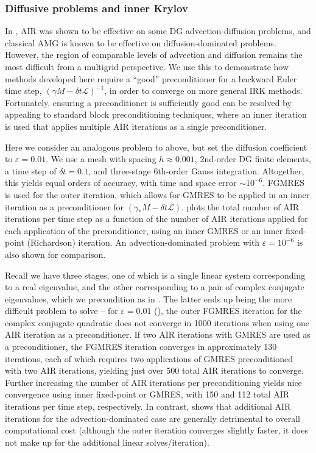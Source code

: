 \documentclass[a4paper,10pt]{article}
\begin{document}
\subsubsection{Diffusive problems and inner Krylov}\label{sec:numerics:dg:diff}

In \cite{Manteuffel:2019}, AIR was shown to be effective on some DG advection-diffusion
problems, and classical AMG is known to be effective on diffusion-dominated
problems. However, the region of comparable levels of advection and diffusion
remains the most difficult from a multigrid perspective. We use this to
demonstrate how methods developed here require a ``good'' preconditioner
for a backward Euler time step, $(\gamma M - \delta t \mathcal{L})^{-1}$,
in order to converge on more general IRK
methods. Fortunately, ensuring a preconditioner is sufficiently good can be
resolved by appealing to standard block preconditioning techniques, where an inner
iteration is used that applies multiple AIR iterations as a single preconditioner.

Here we consider an analogous problem to above, but set the diffusion coefficient
to $\varepsilon = 0.01$. We use a mesh with spacing $h \approx 0.001$, 2nd-order
DG finite elements, a time step of $\delta t = 0.1$, and three-stage 6th-order
Gauss integration. Altogether, this yields equal orders of accuracy, with time and
space error $\sim10^{-6}$. FGMRES \cite{saad1993flexible} is used for the
outer iteration, which allows for GMRES to be applied in an inner iteration
as a preconditioner for $(\gamma_* M - \delta t \mathcal{L})$.  plots the
total number of AIR iterations per time step as a function of the number of
AIR iterations applied for each application of the preconditioner, using an
inner GMRES or an inner fixed-point (Richardson) iteration. An advection-dominated
problem with $\varepsilon = 10^{-6}$ is also shown for comparison.

Recall we have three stages, one of which is a single linear system corresponding
to a real eigenvalue, and the other corresponding to a pair of complex conjugate
eigenvalues, which we precondition as in . The latter ends up being
the more difficult problem to solve -- for $\varepsilon =0.01$ (),
the outer FGMRES iteration for the complex conjugate quadratic does not converge in
1000 iterations when using one AIR iteration as a preconditioner.
If two AIR iterations with GMRES are used as a preconditioner,
the FGMRES iteration converges in approximately 130 iterations, each of which
requires two applications of GMRES preconditioned with two AIR iterations,
yielding just over 500 total AIR iterations to converge. Further increasing
the number of AIR iterations per preconditioning yields nice convergence
using inner fixed-point or GMRES, with 150 and 112 total AIR iterations per
time step, respectively. In contrast,  shows that
additional AIR iterations for the advection-dominated case are generally
detrimental to overall computational cost (although the outer iteration
converges slightly faster, it does not make up for the additional linear
solves/iteration).
\end{document}
